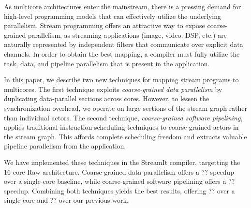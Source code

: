 As multicore architectures enter the mainstream, there is a pressing
demand for high-level programming models that can effectively utilize
the underlying parallelism.  Stream programming offers an attractive
way to expose coarse-grained parallelism, as streaming applications
(image, video, DSP, etc.) are naturally represented by independent
filters that communicate over explicit data channels.  In order to
obtain the best mapping, a compiler must fully utilize the task, data,
and pipeline parallelism that is present in the application.

In this paper, we describe two new techniques for mapping stream
programs to multicores.  The first technique exploits {\it
coarse-grained data parallelism} by duplicating data-parallel sections
across cores.  However, to lessen the synchronization overhead, we
operate on large sections of the stream graph rather than individual
actors.  The second technique, {\it coarse-grained software
pipelining}, applies traditional instruction-scheduling techniques to
coarse-grained actors in the stream graph.  This affords complete
scheduling freedom and extracts valuable pipeline parallelism from the
application.

We have implemented these techniques in the StreamIt compiler,
targetting the 16-core Raw architecture.  Coarse-grained data
parallelism offers a ?? speedup over a single-core baseline, while
coarse-grained software pipelining offers a ?? speedup.  Combining
both techniques yields the best results, offering ?? over a single
core and ?? over our previous work.
